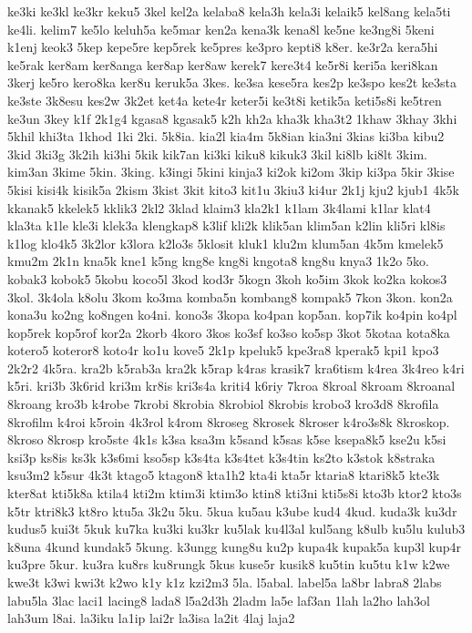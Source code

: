 {ke3ki ke3kl ke3kr keku5 3kel kel2a kelaba8 kela3h kela3i kelaik5 kel8ang
kela5ti ke4li. kelim7 ke5lo keluh5a ke5mar ken2a kena3k kena8l ke5ne
ke3ng8i 5keni k1enj keok3 5kep kepe5re kep5rek ke5pres ke3pro kepti8 k8er.
ke3r2a kera5hi ke5rak ker8am ker8anga ker8ap ker8aw kerek7 kere3t4 ke5r8i
keri5a keri8kan 3kerj ke5ro kero8ka ker8u keruk5a 3kes. ke3sa kese5ra
kes2p ke3spo kes2t ke3sta ke3ste 3k8esu kes2w 3k2et ket4a kete4r keter5i
ke3t8i ketik5a keti5s8i ke5tren ke3un 3key k1f 2k1g4 kgasa8 kgasak5 k2h
kh2a kha3k kha3t2 1khaw 3khay 3khi 5khil khi3ta 1khod 1ki 2ki. 5k8ia.
kia2l kia4m 5k8ian kia3ni 3kias ki3ba kibu2 3kid 3ki3g 3k2ih ki3hi 5kik
kik7an ki3ki kiku8 kikuk3 3kil ki8lb ki8lt 3kim. kim3an 3kime 5kin. 3king.
k3ingi 5kini kinja3 ki2ok ki2om 3kip ki3pa 5kir 3kise 5kisi kisi4k kisik5a
2kism 3kist 3kit kito3 kit1u 3kiu3 ki4ur 2k1j kju2 kjub1 4k5k kkanak5
kkelek5 kklik3 2kl2 3klad klaim3 kla2k1 k1lam 3k4lami k1lar klat4 kla3ta
k1le kle3i klek3a klengkap8 k3lif kli2k klik5an klim5an k2lin kli5ri kl8is
k1log klo4k5 3k2lor k3lora k2lo3s 5klosit kluk1 klu2m klum5an 4k5m kmelek5
kmu2m 2k1n kna5k kne1 k5ng kng8e kng8i kngota8 kng8u knya3 1k2o 5ko.
kobak3 kobok5 5kobu koco5l 3kod kod3r 5kogn 3koh ko5im 3kok ko2ka kokos3
3kol. 3k4ola k8olu 3kom ko3ma komba5n kombang8 kompak5 7kon 3kon. kon2a
kona3u ko2ng ko8ngen ko4ni. kono3s 3kopa ko4pan kop5an. kop7ik ko4pin
ko4pl kop5rek kop5rof kor2a 2korb 4koro 3kos ko3sf ko3so ko5sp 3kot 5kotaa
kota8ka kotero5 koteror8 koto4r ko1u kove5 2k1p kpeluk5 kpe3ra8 kperak5
kpi1 kpo3 2k2r2 4k5ra. kra2b k5rab3a kra2k k5rap k4ras krasik7 kra6tism
k4rea 3k4reo k4ri k5ri. kri3b 3k6rid kri3m kr8is kri3s4a kriti4 k6riy
7kroa 8kroal 8kroam 8kroanal 8kroang kro3b k4robe 7krobi 8krobia 8krobiol
8krobis krobo3 kro3d8 8krofila 8krofilm k4roi k5roin 4k3rol k4rom 8kroseg
8krosek 8kroser k4ro3s8k 8kroskop. 8kroso 8krosp kro5ste 4k1s k3sa ksa3m
k5sand k5sas k5se ksepa8k5 kse2u k5si ksi3p ks8is ks3k k3s6mi kso5sp
k3s4ta k3s4tet k3s4tin ks2to k3stok k8straka ksu3m2 k5sur 4k3t ktago5
ktagon8 kta1h2 kta4i kta5r ktaria8 ktari8k5 kte3k kter8at kti5k8a ktila4
kti2m ktim3i ktim3o ktin8 kti3ni kti5s8i kto3b ktor2 kto3s k5tr ktri8k3
kt8ro ktu5a 3k2u 5ku. 5kua ku5au k3ube kud4 4kud. kuda3k ku3dr kudus5
kui3t 5kuk ku7ka ku3ki ku3kr ku5lak ku4l3al kul5ang k8ulb ku5lu kulub3
k8una 4kund kundak5 5kung. k3ungg kung8u ku2p kupa4k kupak5a kup3l kup4r
ku3pre 5kur. ku3ra ku8rs ku8rungk 5kus kuse5r kusik8 ku5tin ku5tu k1w k2we
kwe3t k3wi kwi3t k2wo k1y k1z kzi2m3 5la. l5abal. label5a la8br labra8
2labs labu5la 3lac laci1 lacing8 lada8 l5a2d3h 2ladm la5e laf3an 1lah
la2ho lah3ol lah3um l8ai. la3iku la1ip lai2r la3isa la2it 4laj laja2
}
